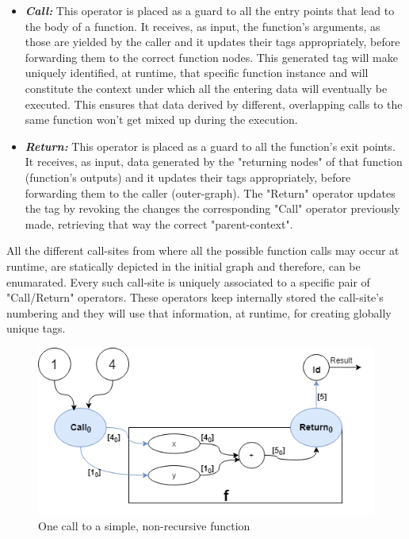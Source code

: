 \documentclass[ack,preface]{dithesis}
\begin{document}
    \begin{itemize}

    \item \textit{\textbf{Call:}} This operator is placed as a guard to all the entry points that lead to the body of a function. It receives, as input, the function's arguments, as those are yielded by the caller and it updates their tags appropriately, before forwarding them to the correct function nodes. This generated tag will make uniquely identified, at runtime, that specific function instance and will constitute the context under which all the entering data will eventually be executed. This ensures that data derived by different, overlapping calls to the same function won't get mixed up during the execution.

    \item \textit{\textbf{Return:}} This operator is placed as a guard to all the function's exit points. It receives, as input, data generated by the "returning nodes" of that function (function's outputs) and it updates their tags appropriately, before forwarding them to the caller (outer-graph).  The "Return" operator updates the tag by revoking the changes the corresponding "Call" operator previously made, retrieving that way the correct "parent-context".

    \end{itemize}

All the different call-sites from where all the possible function calls may occur at runtime, are statically depicted in the initial graph and therefore, can be enumarated.
Every such call-site is uniquely associated to a specific pair of "Call/Return" operators. These operators keep internally stored the call-site's numbering and they will use that information, at runtime, for creating globally unique tags. 

\begin{figure}
\centering
\includegraphics[scale=0.65]{figures/Example1}
\caption{One call to a simple, non-recursive function}
\end{figure}
\end{document}
